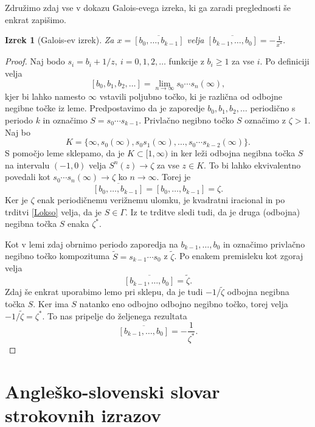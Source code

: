 \documentclass[a4paper,12pt]{article}
\newtheorem*{izrek}{Izrek}
\newenvironment{dokaz}[1][Dokaz]{\begin{proof}}{\end{proof}}
\begin{document}
Združimo zdaj vse v dokazu Galois-evega izreka, ki ga zaradi preglednosti še enkrat zapišimo.

\begin{izrek}[Galois-ev izrek]
	Za $x = \overline{[b_0, \ldots, b_{k-1}]}$ velja $\overline{[b_{k-1}, \ldots, b_0]} = - \frac{1}{x^*}.$
\end{izrek}


\begin{dokaz}
    Naj bodo $s_i = b_i + 1/z,\ i = 0, 1, 2, \ldots$ funkcije z $b_i \geq 1$ za vse $i$. Po definiciji velja
    \[
        [b_0, b_1, b_2, \ldots] = \lim_{n \to \infty} s_0\cdots s_n (\infty),   
    \]
    kjer bi lahko namesto $\infty$ vstavili poljubno točko, ki je različna od odbojne negibne točke iz leme. Predpostavimo da je zaporedje $b_0, b_1, b_2, \ldots$ periodično s periodo $k$ in označimo $S = s_0\cdots s_{k-1}$. Privlačno negibno točko $S$ označimo z $\zeta > 1$. Naj bo
    \[
        K = \{ \infty, s_0(\infty), s_0s_1(\infty), \ldots, s_0\cdots s_{k-2}(\infty)\}.
    \]
    S pomočjo leme sklepamo, da je $K \subset [1, \infty)$ in ker leži odbojna negibna točka $S$ na intervalu $(-1, 0)$ velja $S^n(z) \to \zeta$ za vse $z \in K$. To bi lahko ekvivalentno povedali kot $s_0\cdots s_n(\infty) \to \zeta$ ko $n \to \infty$. Torej je
    \[
        \overline{[b_0, \ldots, b_{k-1}]} = [b_0, \ldots, b_{k-1}] = \zeta.
    \]
    Ker je $\zeta$ enak periodičnemu verižnemu ulomku, je kvadratni iracional in po trditvi \ref{Lokso} velja, da je $S \in \Gamma$. Iz te trditve sledi tudi, da je druga (odbojna) negibna točka $S$ enaka $\zeta^*$.

    Kot v lemi zdaj obrnimo periodo zaporedja na $b_{k-1}, \ldots, b_0$ in označimo privlačno negibno točko kompozituma $\tilde{S} = s_{k-1}\cdots s_0$ z $\tilde{\zeta}$. Po enakem premisleku kot zgoraj velja
    \[
        \overline{[b_{k-1}, \ldots, b_0]} = \tilde{\zeta}.
    \]
    Zdaj še enkrat uporabimo lemo pri sklepu, da je tudi $- 1 / \tilde{\zeta}$ odbojna negibna točka $S$. Ker ima $S$ natanko eno odbojno odbojno negibno točko, torej velja $- 1 / \tilde{\zeta} = \zeta^*$. To nas pripelje do željenega rezultata
    \[
        \overline{[b_{k-1}, \ldots, b_0]} = - \frac{1}{\zeta^*}.
    \]
\end{dokaz}
\newpage


\section*{Angleško-slovenski slovar strokovnih izrazov}
\end{document}
